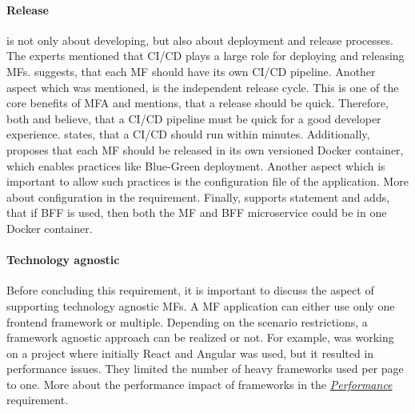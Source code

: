 \paragraph{Release}

\textit{} is not only about developing, but also about deployment and release processes.
The experts mentioned that \ac{CI/CD} plays a large role for deploying and releasing \acp{MF}.
\textciteRehm{} suggests, that each \ac{MF} should have its own \ac{CI/CD} pipeline.
Another aspect which was mentioned, is the independent release cycle.
This is one of the core benefits of \ac{MFA} and \citeauthorRehm{} mentions, that a release should be quick.
Therefore, both \textciteMezzalira{} and \citeauthorRehm{} believe, that a \ac{CI/CD} pipeline must be quick for a good developer experience.
\citeauthorMezzalira{} states, that a \ac{CI/CD} should run within minutes.
Additionally, \citeauthorRehm{} proposes that each \ac{MF} should be released in its own versioned Docker container\footnotemark, which enables practices like Blue-Green deployment.
Another aspect which is important to allow such practices is the configuration file of the application.
More about configuration in the \textit{} requirement.
Finally, \textcite{Laug.2018} supports \citeauthorRehm{} statement and adds, that if \ac{BFF} is used, then both the \ac{MF} and \ac{BFF} microservice could be in one Docker container.



\paragraph{Technology agnostic}

Before concluding this requirement, it is important to discuss the aspect of supporting technology agnostic \acp{MF}.
A \ac{MF} application can either use only one frontend framework or multiple.
Depending on the scenario restrictions, a framework agnostic approach can be realized or not.
For example, \textciteJovanovic{} was working on a project where initially React and Angular was used, but it resulted in performance issues.
They limited the number of heavy frameworks used per page to one.
More about the performance impact of frameworks in the \textit{\hyperref[cha:requirement_detail_performance]{Performance}} requirement.

